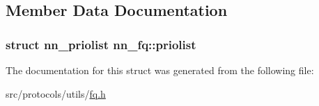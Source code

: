 \subsection{Member Data Documentation}
\subsubsection[{priolist}]{\setlength{\rightskip}{0pt plus 5cm}struct {\bf nn\+\_\+priolist} nn\+\_\+fq\+::priolist}\hypertarget{structnn__fq_a5bce08b6089ff9f0ebaf17cf07a45184}{}\label{structnn__fq_a5bce08b6089ff9f0ebaf17cf07a45184}


The documentation for this struct was generated from the following file\+:\begin{DoxyCompactItemize}
\item 
src/protocols/utils/\hyperlink{fq_8h}{fq.\+h}\end{DoxyCompactItemize}
